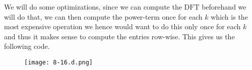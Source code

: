\documentclass{article}
\begin{document}
\pagebreak

\noindent We will do some optimizations, since we can compute the $\mathrm{DFT}$ beforehand we will do that, we can then compute the power-term once for each $k$ which is the most expensive operation we hence would want to do this only once for each $k$ and thus it makes sense to compute the entries row-wise. This gives us the following code.

\begin{figure}[!hbt]
    \centering
\texttt{[image: 8-16.d.png]}
\end{figure}
\end{document}
